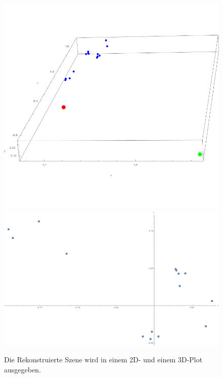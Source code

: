\begin{figure}[!htb]
	\includegraphics[width=\linewidth]{images/reconstructed_Points_Same_Resolutions.png}
	\endminipage\hfill
	\includegraphics[width=\linewidth]{images/reconstructed_Points_Same_Resolutions2D.png}
	\endminipage\hfill
		\caption[Rekonstruierte Szene in 2D und 3D]{Die Rekonstruierte Szene wird in einem 2D- und einem 3D-Plot ausgegeben.}
	\label{fig:reconstructedSampson2D3D}
\end{figure}



